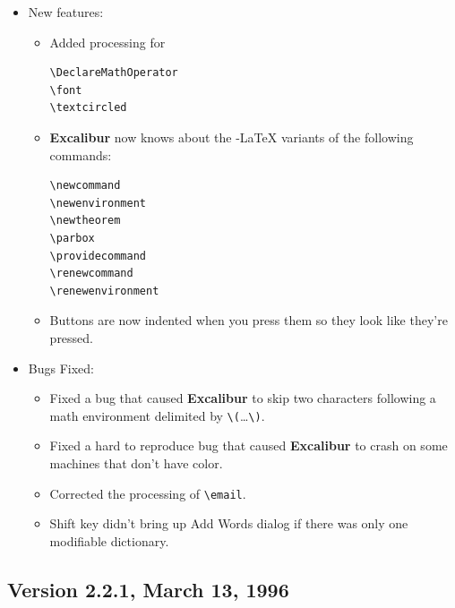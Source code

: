 ﻿\documentclass[11pt,titlepage]{article}
\newcommand{\ex}{\textbf{Excalibur}}
\newcommand{\AmS}{\latex{{\protect\the\textfont2
        A\kern-.1667em\lower.5ex\hbox{M}\kern-.125emS}}\html{AMS}}
\begin{document}
\begin{itemize}
\item New features:

  \begin{itemize}
  \item Added processing for
\begin{verbatim}
\DeclareMathOperator
\font
\textcircled
\end{verbatim}

  \item \ex{} now knows about the \AmS-\LaTeX{} variants of the
    following commands:
\begin{verbatim}
\newcommand
\newenvironment
\newtheorem
\parbox
\providecommand
\renewcommand
\renewenvironment
\end{verbatim}

  \item Buttons are now indented when you press them so they look like
    they're pressed.
  \end{itemize}

\item Bugs Fixed:

  \begin{itemize}

  \item Fixed a bug that caused \ex{} to skip two characters following
    a math environment delimited by \verb+\(+\ldots\verb+\)+.

  \item Fixed a hard to reproduce bug that caused \ex{} to crash
    on some machines that don't have color.

  \item Corrected the processing of \verb+\email+.

  \item Shift key didn't bring up Add Words dialog if there was only
    one modifiable dictionary.

  \end{itemize}

\end{itemize}

\subsection{Version 2.2.1, March 13, 1996}
\end{document}
